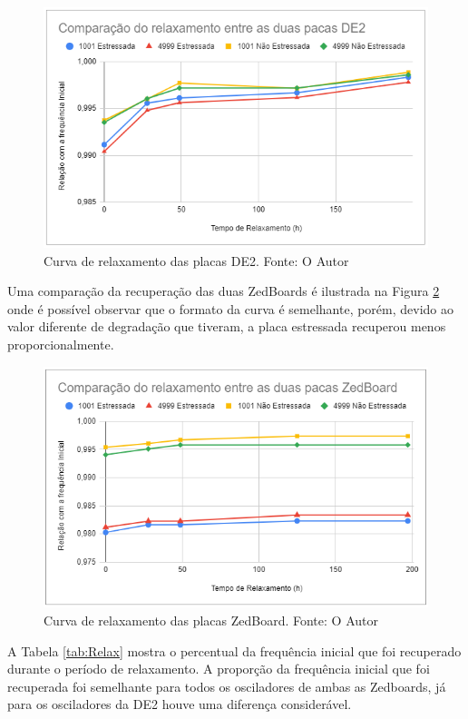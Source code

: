 \begin{figure}[H]
    \centering
    \includegraphics[scale=0.75]{figures/Resultados/RelaxDE2}
    \caption{Curva de relaxamento das placas DE2. Fonte: O Autor}
    \label{fig:RelaxDE2}
\end{figure}

Uma comparação da recuperação das duas ZedBoards é ilustrada na Figura \ref{fig:RelaxZedBoard} onde é possível observar que o formato da curva é semelhante, porém, devido ao valor diferente de degradação que tiveram, a placa estressada recuperou menos proporcionalmente.

\begin{figure}[H]
    \centering
    \includegraphics[scale=0.75]{figures/Resultados/RelaxZedBoard}
    \caption{Curva de relaxamento das placas ZedBoard. Fonte: O Autor}
    \label{fig:RelaxZedBoard}
\end{figure}

A Tabela \ref{tab:Relax} mostra o percentual da frequência inicial que foi recuperado durante o período de relaxamento. A proporção da frequência inicial que foi recuperada foi semelhante para todos os osciladores de ambas as Zedboards, já para os osciladores da DE2 houve uma diferença considerável.

